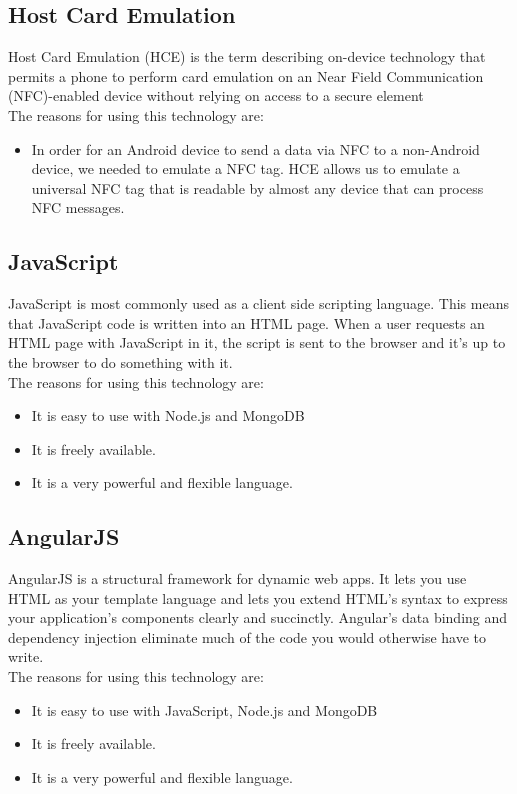 \subsection{Host Card Emulation}
Host Card Emulation (HCE) is the term describing on-device technology that permits a phone to perform card emulation on an Near Field Communication (NFC)-enabled device without relying on access to a secure element
\\The reasons for using this technology are:
\begin{itemize}
\item In order for an Android device to send a data via NFC to a non-Android device, we needed to emulate a NFC tag. HCE allows us to emulate a universal NFC tag that is readable by almost any device that can process NFC messages.

\end{itemize}

\subsection{JavaScript}
JavaScript is most commonly used as a client side scripting language. This means that JavaScript code is written into an HTML page. When a user requests an HTML page with JavaScript in it, the script is sent to the browser and it's up to the browser to do something with it.
\\The reasons for using this technology are:
\begin{itemize}
\item It is easy to use with Node.js and MongoDB
\item It is freely available.
\item It is a very powerful and flexible language.
\end{itemize}

\subsection{AngularJS}

AngularJS is a structural framework for dynamic web apps. It lets you use HTML as your template language and lets you extend HTML's syntax to express your application's components clearly and succinctly. Angular's data binding and dependency injection eliminate much of the code you would otherwise have to write.
\\The reasons for using this technology are:
\begin{itemize}
\item It is easy to use with JavaScript, Node.js and MongoDB
\item It is freely available.
\item It is a very powerful and flexible language.
\end{itemize}

